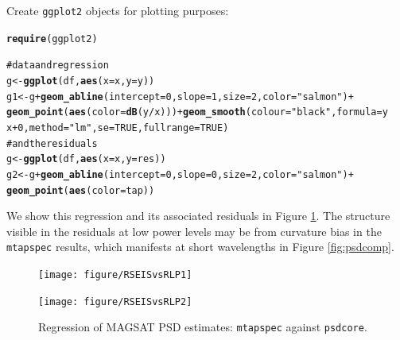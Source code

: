 \documentclass{article}\usepackage{graphicx, color}
\makeatletter
\newcommand{\hlfunctioncall}[1]{\textcolor[rgb]{0.501960784313725,0,0.329411764705882}{\textbf{#1}}}%
\newcommand{\hlstring}[1]{\textcolor[rgb]{0.6,0.6,1}{#1}}%
\newcommand{\hlcomment}[1]{\textcolor[rgb]{0.180392156862745,0.6,0.341176470588235}{#1}}%
\newenvironment{kframe}{%
 \def\at@end@of@kframe{}%
 \ifinner\ifhmode%
  \def\at@end@of@kframe{\end{minipage}}%
  \begin{minipage}{\columnwidth}%
 \fi\fi%
 \def\FrameCommand##1{\hskip\@totalleftmargin \hskip-\fboxsep
 \colorbox{shadecolor}{##1}\hskip-\fboxsep
     \hskip-\linewidth \hskip-\@totalleftmargin \hskip\columnwidth}%
 \MakeFramed {\advance\hsize-\width
   \@totalleftmargin\z@ \linewidth\hsize
   \@setminipage}}%
 {\par\unskip\endMakeFramed%
 \at@end@of@kframe}
\newenvironment{knitrout}{}{} %
\newcommand{\Rcmd}[1]{\texttt{#1}}
\makeatother
\begin{document}
Create \Rcmd{ggplot2} objects for plotting purposes:
\begin{knitrout}
\color{fgcolor}\begin{kframe}
\begin{alltt}
\hlfunctioncall{require}(ggplot2)
\end{alltt}


{\ttfamily\noindent\itshape\color{messagecolor}{\#\# Loading required package: ggplot2}}\begin{alltt}
\hlcomment{# data and regression}
g <- \hlfunctioncall{ggplot}(df, \hlfunctioncall{aes}(x = x, y = y))
g1 <- g + \hlfunctioncall{geom_abline}(intercept = 0, slope = 1, size = 2, color = \hlstring{"salmon"}) + 
    \hlfunctioncall{geom_point}(\hlfunctioncall{aes}(color = \hlfunctioncall{dB}(y/x))) + \hlfunctioncall{geom_smooth}(colour = \hlstring{"black"}, formula = y ~ 
    x + 0, method = \hlstring{"lm"}, se = TRUE, fullrange = TRUE)
\hlcomment{# and the residuals}
g <- \hlfunctioncall{ggplot}(df, \hlfunctioncall{aes}(x = x, y = res))
g2 <- g + \hlfunctioncall{geom_abline}(intercept = 0, slope = 0, size = 2, color = \hlstring{"salmon"}) + 
    \hlfunctioncall{geom_point}(\hlfunctioncall{aes}(color = tap))
\end{alltt}
\end{kframe}
\end{knitrout}

We show this regression and its 
associated residuals in Figure \ref{fig:psdreg}.  
The structure visible in the residuals
at low power levels may be from curvature bias in
the \Rcmd{mtapspec} results, which
manifests at short wavelengths
in Figure \ref{fig:psdcomp}.

\begin{figure}[htb!]
\begin{center}
\begin{knitrout}
\color{fgcolor}
\texttt{[image: figure/RSEISvsRLP1]} 

\end{knitrout}

\begin{knitrout}
\color{fgcolor}
\texttt{[image: figure/RSEISvsRLP2]} 

\end{knitrout}

\caption{Regression of  MAGSAT PSD estimates: 
\Rcmd{mtapspec} against \Rcmd{psdcore}.}
\label{fig:psdreg}
\end{center}
\end{figure}
\end{document}

